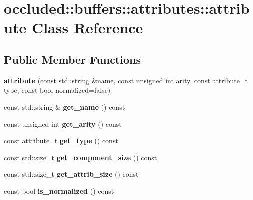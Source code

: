 \hypertarget{classoccluded_1_1buffers_1_1attributes_1_1attribute}{\section{occluded\+:\+:buffers\+:\+:attributes\+:\+:attribute Class Reference}
\label{classoccluded_1_1buffers_1_1attributes_1_1attribute}
}
\subsection*{Public Member Functions}
\begin{DoxyCompactItemize}
\item 
\hypertarget{classoccluded_1_1buffers_1_1attributes_1_1attribute_a31868f0f2c3714b048bde8aca537755e}{{\bfseries attribute} (const std\+::string \&name, const unsigned int arity, const attribute\+\_\+t type, const bool normalized=false)}\label{classoccluded_1_1buffers_1_1attributes_1_1attribute_a31868f0f2c3714b048bde8aca537755e}

\item 
\hypertarget{classoccluded_1_1buffers_1_1attributes_1_1attribute_a883bbea2242dd4f81a8bd6edde01d956}{const std\+::string \& {\bfseries get\+\_\+name} () const }\label{classoccluded_1_1buffers_1_1attributes_1_1attribute_a883bbea2242dd4f81a8bd6edde01d956}

\item 
\hypertarget{classoccluded_1_1buffers_1_1attributes_1_1attribute_a4ea58b1332778b6936234a53d73543d5}{const unsigned int {\bfseries get\+\_\+arity} () const }\label{classoccluded_1_1buffers_1_1attributes_1_1attribute_a4ea58b1332778b6936234a53d73543d5}

\item 
\hypertarget{classoccluded_1_1buffers_1_1attributes_1_1attribute_a1b1c4b6762664a2d8ef5f410e3bf2545}{const attribute\+\_\+t {\bfseries get\+\_\+type} () const }\label{classoccluded_1_1buffers_1_1attributes_1_1attribute_a1b1c4b6762664a2d8ef5f410e3bf2545}

\item 
\hypertarget{classoccluded_1_1buffers_1_1attributes_1_1attribute_a012ea3f8aa212784b7bb7d0cd8b490b9}{const std\+::size\+\_\+t {\bfseries get\+\_\+component\+\_\+size} () const }\label{classoccluded_1_1buffers_1_1attributes_1_1attribute_a012ea3f8aa212784b7bb7d0cd8b490b9}

\item 
\hypertarget{classoccluded_1_1buffers_1_1attributes_1_1attribute_a7c99ea65b61108b80e935f985cb125a2}{const std\+::size\+\_\+t {\bfseries get\+\_\+attrib\+\_\+size} () const }\label{classoccluded_1_1buffers_1_1attributes_1_1attribute_a7c99ea65b61108b80e935f985cb125a2}

\item 
\hypertarget{classoccluded_1_1buffers_1_1attributes_1_1attribute_a53b604a3b38c68892bb8691f89dd78dd}{const bool {\bfseries is\+\_\+normalized} () const }\label{classoccluded_1_1buffers_1_1attributes_1_1attribute_a53b604a3b38c68892bb8691f89dd78dd}

\end{DoxyCompactItemize}


